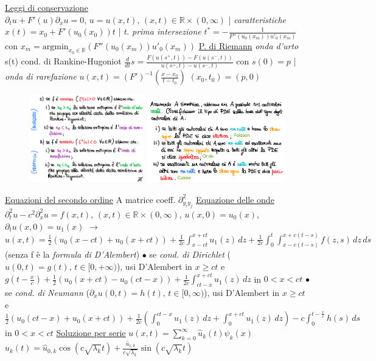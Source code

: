 \documentclass{article}
\begin{document}
\underline{Leggi di conservazione} $\partial_t u + F'(u)\partial_x u = 0,\, u=u(x,t), \, (x,t) \in \mathbb{R} \times (0, \infty)$ | \textit{caratteristiche} $x(t)=x_0 + F'(u_0 (x_0 ))t$ | \textit{t. prima intersezione} $t^* = -\frac{1}{F''(u_0 (x_m))u'_0(x_m)}$ con $x_m=\text{argmin}_{x_0 \in \mathbb{R}}(F''(u_0 (x_m))u'_0(x_m)) $
\underline{P. di Riemann} \textit{onda d'urto} s(t) cond. di Rankine-Hugoniot $\frac{d}{dt}s = \frac{F(u(s^+,t))-F(u(s^-,t))}{u(s^+,t)-u(s^-,t)}$ con $s(0)=p$
| \textit{onda di rarefazione} $u(x,t)=(F')^{-1}(\frac{x-x_0}{t-t_0})$ $(x_0,t_0)=(p,0)$
\begin{figure}
\includegraphics[width=5cm]{Sol_entropica.png}
\includegraphics[width=6cm]{secondo_ordine.png}
\end{figure}
\underline{Equazioni del secondo ordine} A matrice coeff. $\partial^2_{y_i y_j}$
\underline{Equazione delle onde} $\partial_t^2u-c^2\partial_x^2u=f(x,t)$, $(x,t) \in \mathbb{R} \times (0,\infty)$, $u(x,0)=u_0(x)$, $\partial_tu(x,0)=u_1(x)$ 
$\rightarrow$
 $u(x,t)=\frac{1}{2}(u_0(x-ct)+u_0(x+ct))+\frac{1}{2c}\int_{x-ct}^{x+ct}u_1(z)\,dz+\frac{1}{2c}\int_0^t\int_{x-c(t-s)}^{x+c(t-s)}f(z,s)\,dz\,ds$ (senza f è la \textit{formula di D'Alembert}) $\bullet$ se \textit{cond. di Dirichlet} ($u(0,t)=g(t),\,t\in[0,+\infty)$), usi D'Alembert 
 in $x\geq ct$ e $g(t-\frac{x}{c})+\frac{1}{2}(u_0(x+ct)-u_0(ct-x))+\frac{1}{2c}\int_{ct-x}^{x+ct}u_1(z)\,dz$ in $0<x<ct$
 $\bullet$ se \textit{cond. di Neumann} ($\partial_xu(0,t)=h(t),\,t\in[0,\infty)$), usi D'Alembert in $x\geq ct$ e $\frac{1}{2}(u_0(ct-x)+u_0(x+ct))+\frac{1}{2c}(\int_0^{ct-x}u_1(z)\,dz + \int_0^{x+ct}u_1(z)\,dz)-c\int_0^{t-\frac{x}{c}}h(s)\,ds$ in $0<x<ct $
\underline{Soluzione per serie} $u(x,t)=\sum_{k=0}^\infty \hat{u}_k(t)\psi_k(x)$ 
\quad $\hat{u}_k(t)=\hat{u}_{0,k}\cos (c\sqrt{\lambda_k}t)+\frac{\hat{u}_{1,k}}{c\sqrt{\lambda_k}}\sin (c\sqrt{\lambda_k}t)$
\end{document}
